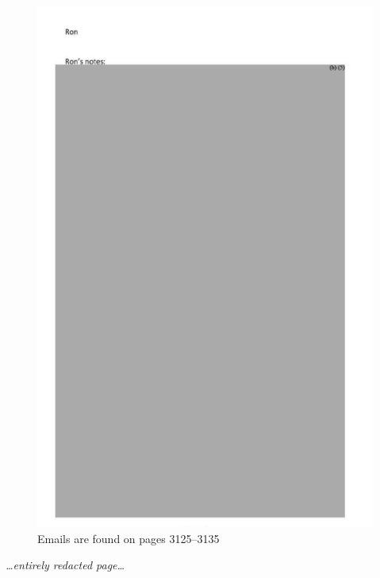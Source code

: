\documentclass[11pt]{article}
\begin{document}
\begin{figure}[htbp]
\centering
\includegraphics[width=.9\linewidth]{./images/email-zh-6.png}
\caption{Emails are found on pages 3125--3135}
\end{figure}
\emph{\ldots{}entirely redacted page\ldots{}}
\end{document}

